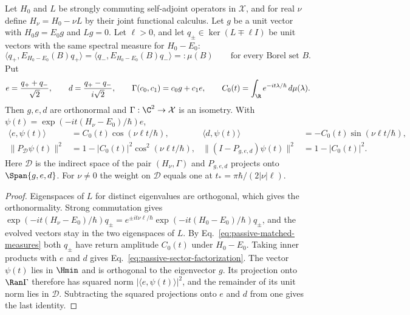 \begin{proposition}
\label{prop:passive-opposite-sectors}
Let $H_0$ and $L$ be strongly commuting self-adjoint operators in $\mathcal X$, and for real $\nu$ define $H_\nu=H_0-\nu L$ by their joint functional calculus. Let $g$ be a unit vector with $H_0g=E_0g$ and $Lg=0$. Let $\ell>0$, and let $q_\pm\in\ker(L\mp\ell I)$ be unit vectors with the same spectral measure for $H_0-E_0$:
\begin{equation}
 \langle q_+,E_{H_0-E_0}(B)q_+\rangle=\langle q_-,E_{H_0-E_0}(B)q_-\rangle=:\mu(B)
 \qquad\text{for every Borel set }B .
 \label{eq:passive-matched-measures}
\end{equation}
Put
\[
 e=\frac{q_++q_-}{\sqrt2},\qquad d=\frac{q_+-q_-}{i\sqrt2},\qquad
 \Gamma(c_0,c_1)=c_0g+c_1e,\qquad
 C_0(t)=\int_\R e^{-it\lambda/\hbar}\,d\mu(\lambda).
\]
Then $g,e,d$ are orthonormal and $\Gamma:\C^2\to\mathcal X$ is an isometry. With $\psi(t)=\exp(-it(H_\nu-E_0)/\hbar)e$,
\begin{align}
 \langle e,\psi(t)\rangle&=C_0(t)\cos(\nu\ell t/\hbar),
 &\langle d,\psi(t)\rangle&=-C_0(t)\sin(\nu\ell t/\hbar),
 \label{eq:passive-sector-factorization}\\
 \|P_{\mathcal D}\psi(t)\|^2&=1-|C_0(t)|^2\cos^2(\nu\ell t/\hbar),
 &\|(I-P_{g,e,d})\psi(t)\|^2&=1-|C_0(t)|^2 .
 \label{eq:passive-sector-departure}
\end{align}
Here $\mathcal D$ is the indirect space of the pair $(H_\nu,\Gamma)$ and $P_{g,e,d}$ projects onto $\Span\{g,e,d\}$. For $\nu\ne0$ the weight on $\mathcal D$ equals one at $t_*=\pi\hbar/(2|\nu|\ell)$.
\end{proposition}
\begin{proof}
Eigenspaces of $L$ for distinct eigenvalues are orthogonal, which gives the orthonormality. Strong commutation gives $\exp(-it(H_\nu-E_0)/\hbar)q_\pm=e^{\pm it\nu\ell/\hbar}\exp(-it(H_0-E_0)/\hbar)q_\pm$, and the evolved vectors stay in the two eigenspaces of $L$. By Eq.~\eqref{eq:passive-matched-measures} both $q_\pm$ have return amplitude $C_0(t)$ under $H_0-E_0$. Taking inner products with $e$ and $d$ gives Eq.~\eqref{eq:passive-sector-factorization}. The vector $\psi(t)$ lies in $\Hmin$ and is orthogonal to the eigenvector $g$. Its projection onto $\Ran\Gamma$ therefore has squared norm $|\langle e,\psi(t)\rangle|^2$, and the remainder of its unit norm lies in $\mathcal D$. Subtracting the squared projections onto $e$ and $d$ from one gives the last identity.
\end{proof}


